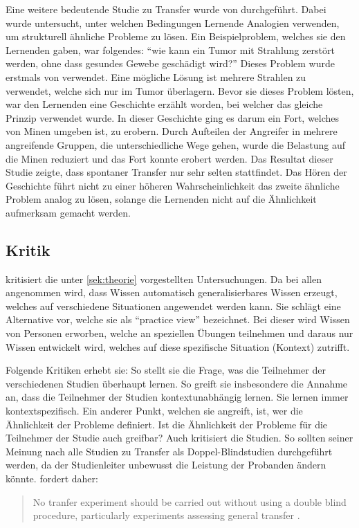 Eine weitere bedeutende Studie zu Transfer wurde von \citet{Gick1980} durchgeführt. Dabei wurde untersucht, unter welchen Bedingungen Lernende Analogien verwenden, um strukturell ähnliche Probleme zu lösen. Ein Beispielproblem, welches sie den Lernenden gaben, war folgendes: "`wie kann ein Tumor mit Strahlung zerstört werden, ohne dass gesundes Gewebe geschädigt wird?"' Dieses Problem wurde erstmals von \citet{Duncker1945} verwendet. Eine mögliche Lösung ist mehrere Strahlen zu verwendet, welche sich nur im Tumor überlagern. Bevor sie dieses Problem lösten, war den Lernenden eine Geschichte erzählt worden, bei welcher das gleiche Prinzip verwendet wurde. In dieser Geschichte ging es darum ein Fort, welches von Minen umgeben ist, zu erobern. Durch Aufteilen der Angreifer in mehrere angreifende Gruppen, die unterschiedliche Wege gehen, wurde die Belastung auf die Minen reduziert und das Fort konnte erobert werden. Das Resultat dieser Studie zeigte, dass spontaner Transfer nur sehr selten stattfindet. Das Hören der Geschichte führt nicht zu einer höheren Wahrscheinlichkeit das zweite ähnliche Problem analog zu lösen, solange die Lernenden nicht auf die Ähnlichkeit aufmerksam gemacht werden.

\subsection{Kritik}

\citet{Lave1988} kritisiert die unter \ref{sek:theorie} vorgestellten Untersuchungen. Da bei allen angenommen wird, dass  Wissen automatisch generalisierbares Wissen erzeugt, welches auf verschiedene Situationen angewendet werden kann. Sie schlägt eine Alternative vor,  welche sie als "`practice view"' bezeichnet. Bei dieser wird Wissen von Personen erworben, welche an speziellen Übungen teilnehmen und daraus nur Wissen entwickelt wird, welches auf diese spezifische Situation (Kontext) zutrifft.

Folgende Kritiken erhebt sie: So stellt sie die Frage, was die Teilnehmer der verschiedenen Studien überhaupt lernen. So greift sie insbesondere die Annahme an, dass die Teilnehmer der Studien kontextunabhängig lernen. Sie lernen immer kontextspezifisch. Ein anderer Punkt, welchen sie angreift, ist, wer die Ähnlichkeit der Probleme definiert. Ist die Ähnlichkeit der Probleme für die Teilnehmer der Studie auch greifbar? Auch \citet{Detterman1993} kritisiert die Studien. So sollten seiner Meinung nach alle Studien zu Transfer als Doppel-Blindstudien durchgeführt werden, da der Studienleiter unbewusst die Leistung der Probanden ändern könnte. \citeauthor{Detterman1993} fordert daher:
\begin{quote}
No tranfer experiment should be carried out without using a double blind procedure, particularly experiments assessing general transfer \citep[S. 10]{Detterman1993}.
\end{quote}





